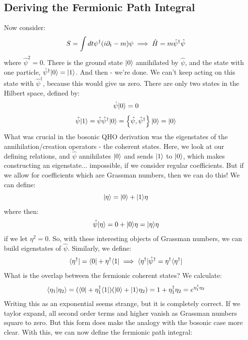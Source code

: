 \subsection{Deriving the Fermionic Path Integral}
Now consider:
\begin{equation}
    S = \int dt \psi^\dagger (i\partial_t - m)\psi \implies \hat{H} = m\hat{\psi}^\dagger \hat{\psi}
\end{equation}
where $\hat{\psi}^2 = 0$. There is the ground state $\lvert 0 \rangle$ annihilated by $\hat{\psi}$, and the state with one particle, $\hat{\psi}^\dagger\lvert 0 \rangle = \lvert 1 \rangle$. And then - we're done. We can't keep acting on this state with $\hat{\psi}^\dag$, because this would give us zero. There are only two states in the Hilbert space, defined by:
\begin{equation}
    \hat{\psi}\lvert 0 \rangle = 0
\end{equation}
\begin{equation}
    \hat{\psi}\lvert 1 \rangle = \hat{\psi}\hat{\psi}^\dagger \lvert 0 \rangle = \set{\hat{\psi}, \hat{\psi}^\dagger}\lvert 0 \rangle = \lvert 0 \rangle
\end{equation}
What was crucial in the bosonic QHO derivation was the eigenstates of the annihilation/creation operators - the coherent states. Here, we look at our defining relations, and $\hat{\psi}$ annihilates $\lvert 0 \rangle$ and sends $\lvert 1 \rangle$ to $\lvert 0 \rangle$, which makes constructing an eigenstate... impossible, if we consider regular coefficients. But if we allow for coefficients which are Grassman numbers, then we can do this! We can define:
\begin{equation}
    \lvert \eta \rangle = \lvert 0 \rangle + \lvert 1 \rangle\eta
\end{equation}
where then:
\begin{equation}
    \hat{\psi}\lvert \eta \rangle = 0 + \lvert 0 \rangle\eta = \lvert \eta \rangle\eta
\end{equation}
if we let $\eta^2 = 0$. So, with these interesting objects of Grassman numbers, we can build eigenstates of $\hat{\psi}$. Similarly, we define:
\begin{equation}
    \langle \eta^\dagger \rvert = \langle 0 \rvert + \eta^\dagger\langle 1 \rvert \implies \langle \eta^\dagger \rvert\hat{\psi}^\dagger = \eta^\dagger \langle \eta^\dagger \rvert
\end{equation}
What is the overlap between the fermionic coherent states? We calculate:
\begin{equation}
    \langle \eta_1 \lvert \eta_2 \rangle = (\langle 0 \rvert + \eta_1^\dagger\langle 1 \rvert)(\lvert 0 \rangle + \lvert 1 \rangle\eta_2) = 1 + \eta_1^\dagger \eta_2 = e^{\eta_1^\dagger \eta_2}
\end{equation}
Writing this as an exponential seems strange, but it is completely correct. If we taylor expand, all second order terms and higher vanish as Grassman numbers square to zero. But this form does make the analogy with the bosonic case more clear. With this, we can now define the fermionic path integral:
